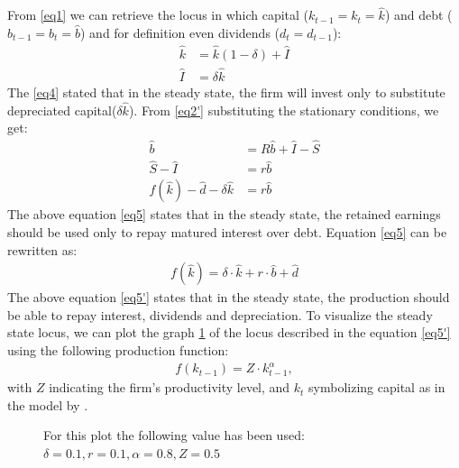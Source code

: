 \documentclass[12pt]{article}
\begin{document}
From \ref{eq1} we can retrieve the locus in which capital (\(k_{t-1}=k_{t}=\widehat{k}\)) and debt (\(b_{t-1}=b_{t} = \widehat{b}\))
 and  for definition even dividends (\(d_t=d_{t-1} \)):
\begin{align*}
    \widehat{k}&=\widehat{k}\left(1-\delta\right) + \widehat{I}\\
    \widehat{I}&=\delta \widehat{k} \tag{4} \label{eq4}
\end{align*}
The \ref{eq4} stated that in the steady state, the firm will invest only to substitute depreciated capital(\(\delta \widehat{k}\)). From \ref{eq2'} substituting the stationary conditions, we get:
\begin{align*}
    \widehat{b} &= R \widehat{b} + \widehat{I} - \widehat{S} \\
    \widehat{S} - \widehat{I} &= r \widehat{b} \\
    f\left(\widehat{k}\right) - \widehat{d} - \delta \widehat{k} &= r \widehat{b} \tag{5} \label{eq5}
\end{align*}
The above equation \ref{eq5} states that in the steady state, the retained earnings should be used only to repay matured
interest over debt.
Equation \ref{eq5} can be rewritten as:
\begin{align*}
    f(\widehat{k}) = \delta \cdot \widehat{k} + r \cdot \widehat{b} + \widehat{d} \tag{5'} \label{eq5'}
\end{align*}
The above equation \ref{eq5'} states that in the steady state, the production should be able to repay interest,
dividends and depreciation. 
To visualize the steady state locus, we can plot the graph \ref{fig:steadystate3d} of the locus described in the
equation \ref{eq5'} using the following production function:
\begin{align*}
    f(k_{t-1}) = Z \cdot k_{t-1}^\alpha, \tag{6} \label{eq6} 
\end{align*}
 with \(Z\) indicating the firm's productivity level, and \(k_t\) symbolizing capital as in the model by
 \cite{CabHarm94}.  

\begin{figure}
    \centering
    
    \caption{For this plot the following value has been used: \(\delta =0.1, r=0.1, \alpha=0.8, Z=0.5\)}
    \label{fig:steadystate3d}
\end{figure}
\end{document}
